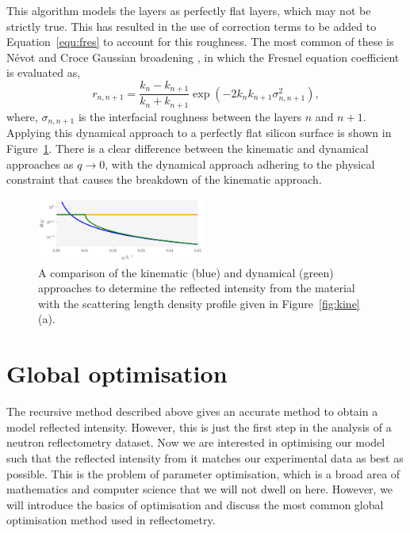 \documentclass[
 reprint,
 superscriptaddress,
 amsmath,amssymb,
 aps,
]{revtex4-1}
\begin{document}
This algorithm models the layers as perfectly flat layers, which may not be strictly true. 
This has resulted in the use of correction terms to be added to Equation~\ref{equ:fres} to account for this roughness. 
The most common of these is N\'{e}vot and Croce Gaussian broadening \cite{nevot_caracterisation_1980}, in which the Fresnel equation coefficient is evaluated as, 
%
\begin{equation}
    r_{n, n+1} = \frac{k_n - k_{n+1}}{k_n + k_{n+1}} \exp{(-2k_nk_{n+1}\sigma^2_{n,n+1})},
\end{equation}
%
where, $\sigma_{n, n+1}$ is the interfacial roughness between the layers $n$ and $n+1$. 
Applying this dynamical approach to a perfectly flat silicon surface is shown in Figure~\ref{fig:dyna}.
There is a clear difference between the kinematic and dynamical approaches as $q \to 0$, with the dynamical approach adhering to the physical constraint that causes the breakdown of the kinematic approach.  
%
\begin{figure}[t]
    \includegraphics[width=0.49\textwidth]{dyna}
    \caption{A comparison of the kinematic (blue) and dynamical (green) approaches to determine the reflected intensity from the material with the scattering length density profile given in Figure~\ref{fig:kine}(a).}
    \label{fig:dyna}
\end{figure}
%


\section{Global optimisation}
The recursive method described above gives an accurate method to obtain a model reflected intensity. 
However, this is just the first step in the analysis of a neutron reflectometry dataset. 
Now we are interested in optimising our model such that the reflected intensity from it matches our experimental data as best as possible. 
This is the problem of parameter optimisation, which is a broad area of mathematics and computer science that we will not dwell on here. 
However, we will introduce the basics of optimisation and discuss the most common global optimisation method used in reflectometry. 
\end{document}
